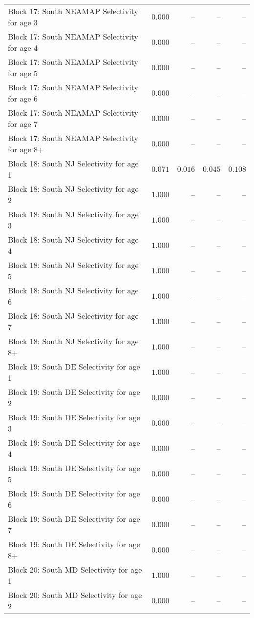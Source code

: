 \documentclass[
]{article}
\begin{document}
\begin{landscape}
\begin{longtable}[t]{lrrrr}
Block 17: South NEAMAP Selectivity for age 3 & $0.000$ & -- & -- & --\\
Block 17: South NEAMAP Selectivity for age 4 & $0.000$ & -- & -- & --\\
Block 17: South NEAMAP Selectivity for age 5 & $0.000$ & -- & -- & --\\
\addlinespace
Block 17: South NEAMAP Selectivity for age 6 & $0.000$ & -- & -- & --\\
Block 17: South NEAMAP Selectivity for age 7 & $0.000$ & -- & -- & --\\
Block 17: South NEAMAP Selectivity for age 8+ & $0.000$ & -- & -- & --\\
Block 18: South NJ Selectivity for age 1 & $0.071$ & $0.016$ & $0.045$ & $0.108$\\
Block 18: South NJ Selectivity for age 2 & $1.000$ & -- & -- & --\\
\addlinespace
Block 18: South NJ Selectivity for age 3 & $1.000$ & -- & -- & --\\
Block 18: South NJ Selectivity for age 4 & $1.000$ & -- & -- & --\\
Block 18: South NJ Selectivity for age 5 & $1.000$ & -- & -- & --\\
Block 18: South NJ Selectivity for age 6 & $1.000$ & -- & -- & --\\
Block 18: South NJ Selectivity for age 7 & $1.000$ & -- & -- & --\\
\addlinespace
Block 18: South NJ Selectivity for age 8+ & $1.000$ & -- & -- & --\\
Block 19: South DE Selectivity for age 1 & $1.000$ & -- & -- & --\\
Block 19: South DE Selectivity for age 2 & $0.000$ & -- & -- & --\\
Block 19: South DE Selectivity for age 3 & $0.000$ & -- & -- & --\\
Block 19: South DE Selectivity for age 4 & $0.000$ & -- & -- & --\\
\addlinespace
Block 19: South DE Selectivity for age 5 & $0.000$ & -- & -- & --\\
Block 19: South DE Selectivity for age 6 & $0.000$ & -- & -- & --\\
Block 19: South DE Selectivity for age 7 & $0.000$ & -- & -- & --\\
Block 19: South DE Selectivity for age 8+ & $0.000$ & -- & -- & --\\
Block 20: South MD Selectivity for age 1 & $1.000$ & -- & -- & --\\
\addlinespace
Block 20: South MD Selectivity for age 2 & $0.000$ & -- & -- & --\\

\end{longtable}
\end{landscape}
\end{document}

